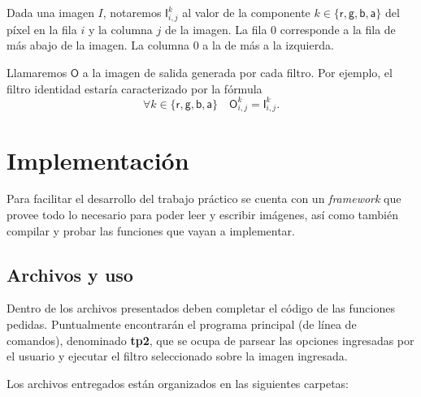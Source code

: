 \documentclass[a4paper, 12pt]{article}
\newcommand{\Alpha}{\ensuremath{\mathsf{a}}\xspace}
\newcommand{\Red  }{\ensuremath{\mathsf{r}}\xspace}
\newcommand{\Green}{\ensuremath{\mathsf{g}}\xspace}
\newcommand{\Blue }{\ensuremath{\mathsf{b}}\xspace}
\begin{document}


Dada una imagen $I$, notaremos $\mathsf{I}_{i,j}^k$ al valor de la componente $k \in \{ \Red, \Green, \Blue, \Alpha \}$ del píxel en la fila $i$ y la columna $j$ de la imagen.
La fila 0 corresponde a la fila de más abajo de la imagen.
La columna 0 a la de más a la izquierda.

Llamaremos $\mathsf{O}$ a la imagen de salida generada por cada filtro. Por ejemplo, el filtro identidad estaría caracterizado por la fórmula
\[ \forall k \in \{\Red,\Green,\Blue,\Alpha\} \quad \mathsf{O}_{i,j}^k = \mathsf{I}_{i,j}^k. \]





\section{Implementación}

Para facilitar el desarrollo del trabajo práctico se cuenta con un
\emph{framework} que provee todo lo necesario para poder leer y
escribir imágenes, así como también compilar y probar las funciones
que vayan a implementar.

\subsection{Archivos y uso}

\vspace*{0.3cm}
Dentro de los archivos presentados deben completar el código de las funciones
pedidas. Puntualmente encontrarán el programa principal (de línea de
comandos), denominado \textbf{tp2}, que se ocupa de parsear las opciones
ingresadas por el usuario y ejecutar el filtro seleccionado sobre la imagen
ingresada.

\vspace*{0.3cm}
\noindent Los archivos entregados están organizados en las siguientes carpetas:
\end{document}

